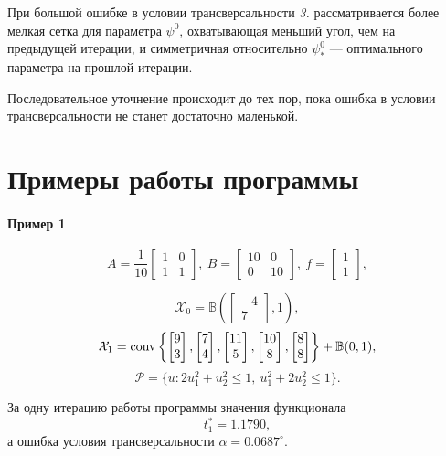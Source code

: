 \documentclass[11pt]{article}
\newcommand\PS{\mathcal{P}}
\newcommand\X{\mathcal{X}}
\newcommand\Cl[2]{\begin{bmatrix}
#1 \\ #2
\end{bmatrix}}
\newcommand\Conv[1]{{\rm conv}\left\{ #1 \right\}}
\begin{document}
При большой ошибке в условии трансверсальности \textit{3.} рассматривается более мелкая сетка для
параметра $\psi^0$, охватывающая меньший угол, чем на предыдущей итерации, и симметричная относительно
$\psi^0_*$ --- оптимального параметра на прошлой итерации.

Последовательное уточнение происходит до тех пор, пока ошибка в условии трансверсальности не 
станет достаточно маленькой.

\section{Примеры работы программы}

\paragraph{Пример 1\\}

\begin{equation}
A = \frac1{10}\begin{bmatrix}
1 & 0 \\ 1 & 1
\end{bmatrix},\ 
B = \begin{bmatrix}
10 & 0 \\ 0 & 10
\end{bmatrix}, \
f = \begin{bmatrix}
1 \\ 1
\end{bmatrix},
\end{equation}

$$\X_0 = \mathbb{B}\left(\Cl{-4}{7}, 1\right),$$
$$\X_1 = \Conv{\Cl{9}{3}, \Cl{7}{4}, \Cl{11}{5}, \Cl{10}{8}, \Cl{8}{8}} + \mathbb{B}(0, 1),$$
$$\PS = \{u\colon 2u_1^2 + u_2^2 \le 1, \ u_1^2 + 2u_2^2 \le 1 \}.$$

За одну итерацию работы программы значения функционала 
$$t_1^* = 1.1790,$$
а ошибка условия трансверсальности $\alpha = 0.0687^\circ$.
\end{document}
